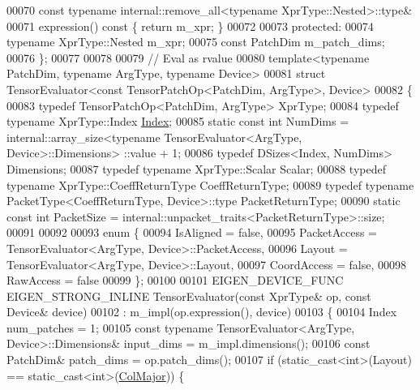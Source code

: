 \begin{DoxyCode}
00070     \textcolor{keyword}{const} \textcolor{keyword}{typename} internal::remove\_all<typename XprType::Nested>::type&
00071     expression()\textcolor{keyword}{ const }\{ \textcolor{keywordflow}{return} m\_xpr; \}
00072 
00073   \textcolor{keyword}{protected}:
00074     \textcolor{keyword}{typename} XprType::Nested m\_xpr;
00075     \textcolor{keyword}{const} PatchDim m\_patch\_dims;
00076 \};
00077 
00078 
00079 \textcolor{comment}{// Eval as rvalue}
00080 \textcolor{keyword}{template}<\textcolor{keyword}{typename} PatchDim, \textcolor{keyword}{typename} ArgType, \textcolor{keyword}{typename} Device>
00081 \textcolor{keyword}{struct }TensorEvaluator<const TensorPatchOp<PatchDim, ArgType>, Device>
00082 \{
00083   \textcolor{keyword}{typedef} TensorPatchOp<PatchDim, ArgType> XprType;
00084   \textcolor{keyword}{typedef} \textcolor{keyword}{typename} XprType::Index \hyperlink{namespace_eigen_a62e77e0933482dafde8fe197d9a2cfde}{Index};
00085   \textcolor{keyword}{static} \textcolor{keyword}{const} \textcolor{keywordtype}{int} NumDims = internal::array\_size<typename TensorEvaluator<ArgType, Device>::Dimensions>
      ::value + 1;
00086   \textcolor{keyword}{typedef} DSizes<Index, NumDims> Dimensions;
00087   \textcolor{keyword}{typedef} \textcolor{keyword}{typename} XprType::Scalar Scalar;
00088   \textcolor{keyword}{typedef} \textcolor{keyword}{typename} XprType::CoeffReturnType CoeffReturnType;
00089   \textcolor{keyword}{typedef} \textcolor{keyword}{typename} PacketType<CoeffReturnType, Device>::type PacketReturnType;
00090   \textcolor{keyword}{static} \textcolor{keyword}{const} \textcolor{keywordtype}{int} PacketSize = internal::unpacket\_traits<PacketReturnType>::size;
00091 
00092 
00093   \textcolor{keyword}{enum} \{
00094     IsAligned = \textcolor{keyword}{false},
00095     PacketAccess = TensorEvaluator<ArgType, Device>::PacketAccess,
00096     Layout = TensorEvaluator<ArgType, Device>::Layout,
00097     CoordAccess = \textcolor{keyword}{false},
00098     RawAccess = \textcolor{keyword}{false}
00099  \};
00100 
00101   EIGEN\_DEVICE\_FUNC EIGEN\_STRONG\_INLINE TensorEvaluator(\textcolor{keyword}{const} XprType& op, \textcolor{keyword}{const} Device& device)
00102       : m\_impl(op.expression(), device)
00103   \{
00104     Index num\_patches = 1;
00105     \textcolor{keyword}{const} \textcolor{keyword}{typename} TensorEvaluator<ArgType, Device>::Dimensions& input\_dims = m\_impl.dimensions();
00106     \textcolor{keyword}{const} PatchDim& patch\_dims = op.patch\_dims();
00107     \textcolor{keywordflow}{if} (static\_cast<int>(Layout) == static\_cast<int>(\hyperlink{group__enums_ggaacded1a18ae58b0f554751f6cdf9eb13a0cbd4bdd0abcfc0224c5fcb5e4f6669a}{ColMajor})) \{

\end{DoxyCode}
